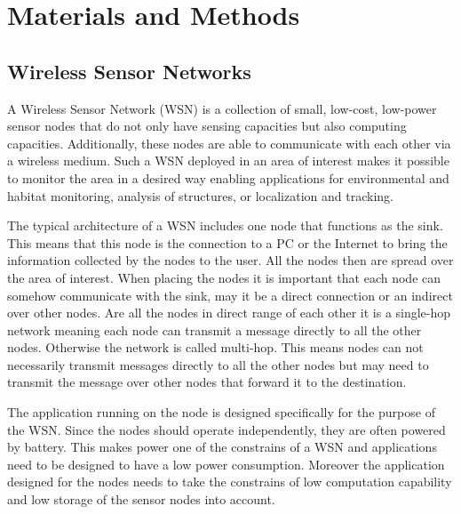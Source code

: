 \chapter{Materials and Methods}

\section{Wireless Sensor Networks}
A Wireless Sensor Network (WSN) is a collection of small, low-cost, low-power sensor nodes that do not only have sensing capacities but also computing capacities. Additionally, these nodes are able to communicate with each other via a wireless medium. Such a WSN deployed in an area of interest makes it possible to monitor the area in a desired way enabling applications for environmental and habitat monitoring, analysis of structures, or localization and tracking.

The typical architecture of a WSN includes one node that functions as the sink. This means that this node is the connection to a PC or the Internet to bring the information collected by the nodes to the user. All the nodes then are spread over the area of interest. When placing the nodes it is important that each node can somehow communicate with the sink, may it be a direct connection or an indirect over other nodes. Are all the nodes in direct range of each other it is a single-hop network meaning each node can transmit a message directly to all the other nodes. Otherwise the network is called multi-hop. This means nodes can not necessarily transmit messages directly to all the other nodes but may need to transmit the message over other nodes that forward it to the destination.

The application running on the node is designed specifically for the purpose of the WSN. Since the nodes should operate independently, they are often powered by battery. This makes power one of the constrains of a WSN and applications need to be designed to have a low power consumption. Moreover the application designed for the nodes needs to take the constrains of low computation capability and low storage of the sensor nodes into account. \cite{Wsn} \cite{Tinyos} 

	

